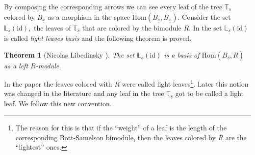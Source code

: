 \documentclass[12pt]{wart}
\newtheorem{thm}{Theorem}[section]
\theoremstyle{remark}
\begin{document}










By composing  the corresponding arrows we can see every leaf  of the tree $\mathbb{T}_{\underline{s}}$ colored by $B_{\underline{x}}$ as a morphism in the space $\mathrm{Hom}(B_{\underline{s}},B_{\underline{x}}).$
Consider the set $\mathbb{L}_{\underline{s}}(\mathrm{id}),$ the leaves of  $\mathbb{T}_{\underline{s}}$ that are colored by the bimodule $R$.  
 In \cite{Li1}  the set $\mathbb{L}_{\underline{s}}(\mathrm{id})$ is called \textit{light leaves basis} and the following theorem is proved.

\begin{thm}[Nicolas Libedinsky ]\label{LLB}
The set $\mathbb{L}_{\underline{s}}(\mathrm{id})$ is a basis of $\mathrm{Hom}(B_{\underline{s}},R)$ as a left $R$-module.
\end{thm}

In the paper \cite{Li1} the leaves colored with $R$ were called light leaves\footnote{The reason for this is that if the ``weight'' of a leaf is the length of the corresponding Bott-Samelson bimodule, then the leaves colored by $R$ are the ``lightest'' ones. }. Later  this notion was changed in the literature and any leaf in the tree $\mathbb{T}_{\underline{s}}$ got to be called a light leaf. We follow this new convention. 
\end{document}
